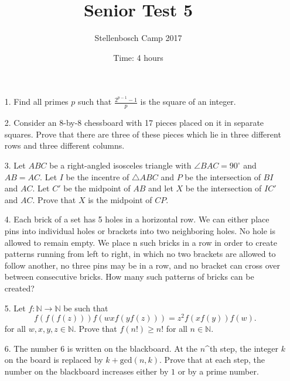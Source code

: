 \documentclass[12pt]{article}
\title{Senior Test 5}
\author{Stellenbosch Camp 2017}
\date{Time: 4 hours}
\begin{document}
 \maketitle

\begin{enumerate}

\item[1.] %
Find all primes $p$ such that $\displaystyle \frac{2^{p-1}-1}{p}$ is the square of an integer.


\item[2.] %
Consider an 8-by-8 chessboard with 17 pieces placed on it in separate squares. Prove that there are three of these pieces which lie in three different rows and three different columns.


\item[3.] %
Let $ABC$ be a right-angled isosceles triangle with $\angle BAC = 90^\circ$ and $AB = AC$. Let $I$ be the incentre of $\triangle ABC$ and $P$ be the intersection of $BI$ and $AC$. Let $C'$ be the midpoint of $AB$ and let $X$ be the intersection of $IC'$ and $AC$. Prove that $X$ is the midpoint of $CP$.


\item[4.] %
Each brick of a set has 5 holes in a horizontal row. We can either place pins into individual holes or brackets into two neighboring holes. No hole is allowed to remain empty. We place n such bricks in a row in order to create patterns running from left to right, in which no two brackets are allowed to follow another, no three pins may be in a row, and no bracket can cross over between consecutive bricks. How many such patterns of bricks can be created?


\item[5.] %
Let $f : \mathbb{N} \to \mathbb{N}$ be such that
  \[ f(f(f(z))) f(wx f(y f(z))) = z^2 f(xf(y)) f(w) .\]
for all $w, x, y, z \in \mathbb{N}$. Prove that $f(n!) \geq n!$ for all $n \in \mathbb{N}$.


\item[6.] %
The number $6$ is written on the blackboard. At the $n$^{th} step, the integer $k$ on the board is replaced by $k + \textrm{gcd}(n, k)$. Prove that at each step, the number on the blackboard increases either by $1$ or by a prime number.

\end{enumerate}

\vfill

\centering
\begin{BVerbatim}
\end{BVerbatim}
\end{document}
